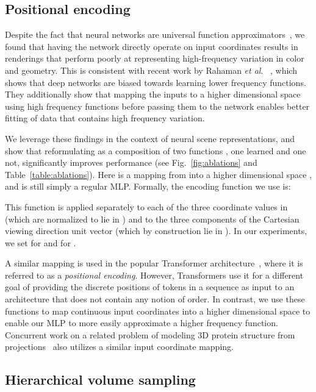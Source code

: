 \documentclass[runningheads]{llncs}
\newcommand{\etal}{\textit{et al}. }
\begin{document}
\subsection{Positional encoding}
\label{sec:posenc}

Despite the fact that neural networks are universal function approximators~\cite{universal}, we found that having the network  directly operate on  input coordinates results in renderings that perform poorly at representing high-frequency variation in color and geometry. This is consistent with recent work by Rahaman \etal~\cite{rahaman2018}, which shows that deep networks are biased towards learning lower frequency functions. They additionally show that mapping the inputs to a higher dimensional space using high frequency functions before passing them to the network enables better fitting of data that contains high frequency variation.

\newcommand{\dummypos}{p}

We leverage these findings in the context of neural scene representations, and show that reformulating  as a composition of two functions , one learned and one not, significantly improves performance (see Fig.~\ref{fig:ablations} and Table~\ref{table:ablations}).
Here  is a mapping from  into a higher dimensional space , and  is still simply a regular MLP. Formally, the encoding function we use is: 

This function  is applied separately to each of the three coordinate values in  (which are normalized to lie in ) and to the three components of the Cartesian viewing direction unit vector  (which by construction lie in ). 
In our experiments, we set  for  and  for . 

A similar mapping is used in the popular Transformer architecture~\cite{transformer}, where it is referred to as a \emph{positional encoding}. However, Transformers use it for a different goal of providing the discrete positions of tokens in a sequence as input to an architecture that does not contain any notion of order. In contrast, we use these functions to map continuous input coordinates into a higher dimensional space to enable our MLP to more easily approximate a higher frequency function. Concurrent work on a related problem of modeling 3D protein structure from projections~\cite{cryoem} also utilizes a similar input coordinate mapping.

\subsection{Hierarchical volume sampling}
\label{sec:hierarchical}
\end{document}
